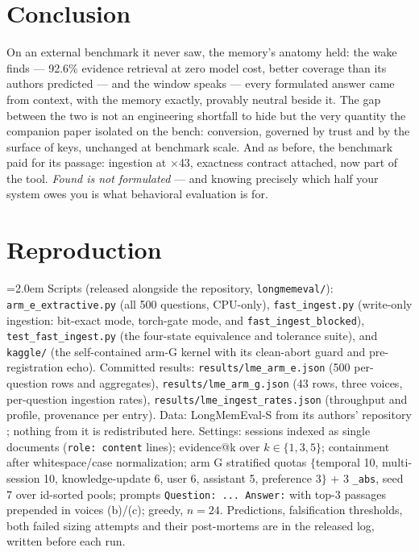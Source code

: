\documentclass[11pt]{article}
\begin{document}
\section{Conclusion}

On an external benchmark it never saw, the memory's anatomy held: the wake finds --- 92.6\% evidence retrieval at zero model cost, better coverage than its authors predicted --- and the window speaks --- every formulated answer came from context, with the memory exactly, provably neutral beside it. The gap between the two is not an engineering shortfall to hide but the very quantity the companion paper isolated on the bench: conversion, governed by trust and by the surface of keys, unchanged at benchmark scale. And as before, the benchmark paid for its passage: ingestion at $\times$43, exactness contract attached, now part of the tool. \emph{Found is not formulated} --- and knowing precisely which half your system owes you is what behavioral evaluation is for.

\appendix

\section{Reproduction}

\begingroup\emergencystretch=2.0em
Scripts (released alongside the repository, \texttt{longmemeval/}): \texttt{arm\_e\_extractive.py} (all 500 questions, CPU-only), \texttt{fast\_ingest.py} (write-only ingestion: bit-exact mode, torch-gate mode, and \texttt{fast\_ingest\_blocked}), \texttt{test\_fast\_ingest.py} (the four-state equivalence and tolerance suite), and \texttt{kaggle/} (the self-contained arm-G kernel with its clean-abort guard and pre-registration echo). Committed results: \texttt{results/lme\_arm\_e.json} (500 per-question rows and aggregates), \texttt{results/lme\_arm\_g.json} (43 rows, three voices, per-question ingestion rates), \texttt{results/lme\_ingest\_rates.json} (throughput and profile, provenance per entry). Data: LongMemEval-S from its authors' repository \cite{longmemeval}; nothing from it is redistributed here. Settings: sessions indexed as single documents (\texttt{role: content} lines); evidence@k over $k \in \{1,3,5\}$; containment after whitespace/case normalization; arm G stratified quotas $\{$temporal 10, multi-session 10, knowledge-update 6, user 6, assistant 5, preference 3$\}$ + 3 \texttt{\_abs}, seed 7 over id-sorted pools; prompts \texttt{Question:~... Answer:} with top-3 passages prepended in voices (b)/(c); greedy, $n{=}24$. Predictions, falsification thresholds, both failed sizing attempts and their post-mortems are in the released log, written before each run.\par\endgroup
\end{document}
